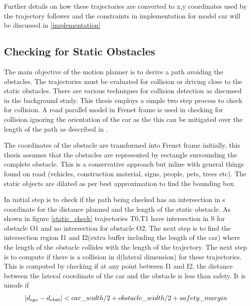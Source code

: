 Further details on how these trajectories are converted to x,y coordinates used by the trajectory follower and the constraints in implementation for model car will be discussed in \ref{implementation}


\newpage


\subsection{Checking for Static Obstacles} \label{osbtacle_check_satic}
The main objective of the motion planner is to derive a path avoiding the obstacles. The trajectories must be evaluated for collision or driving close to the static obstacles. There are various techniques for collision detection as discussed in the background study. This thesis employs a simple two step process to check for collision. A road parallel model in Frenet frame is used in checking for collision ignoring the orientation of the car as the this can be mitigated over the length of the path as described in \cite{cmu_parallel_thesis}. 


The coordinates of the obstacle are transformed into Frenet frame initially, this thesis assumes that the obstacles are represented by rectangle surrounding the complete obstacle. This is a conservative approach but inline with general things found on road (vehicles, construction material, signs, people, pets, trees etc). The static objects are dilated as per best approximation to find the bounding box. 

In initial step is to check if the path being checked has an intersection in s coordinate for the distance planned and the length of the static obstacle. As shown in figure \ref{static_check} trajectories T0,T1 have intersection in S for obstacle O1 and no intersection for obstacle O2. The next step is to find the intersection region I1 and I2(extra buffer including the length of the car) where the length of the obstacle collides with the length of the trajectory. The next step is to compute if there is a collision in d(lateral dimension) for these trajectories. This is computed by checking if at any point between I1 and I2, the distance between the lateral coordinate of the car and the obstacle is less than safety. It is unsafe if 
\begin{equation}
    |d\textsubscript{ego} - d\textsubscript{obst}| < car\_width/2 + obstacle\_width/2 + safety\_margin
    \label{static_obst_safety_dist}
\end{equation}

